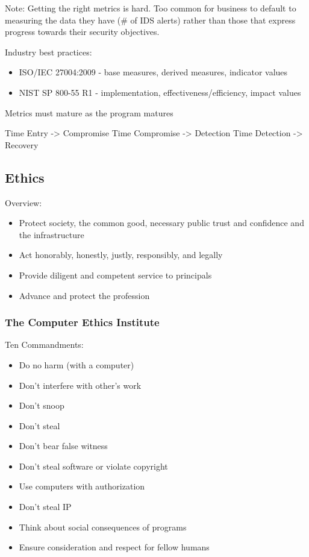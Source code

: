 \documentclass[11pt]{article}
\begin{document}
Note: Getting the right metrics is hard. Too common for business to default to measuring the data they have (\# of IDS alerts) rather than those that express progress towards their security objectives. 

Industry best practices:
\begin{itemize}
\item ISO/IEC 27004:2009 - base measures, derived measures, indicator values
\item NIST SP 800-55 R1 - implementation, effectiveness/efficiency, impact values
\end{itemize}

Metrics must mature as the program matures

Time Entry -> Compromise
Time Compromise -> Detection
Time Detection -> Recovery

\subsection{Ethics}
\label{sec:org9f8ccab}
Overview:
\begin{itemize}
\item Protect society, the common good, necessary public trust and confidence and the infrastructure
\item Act honorably, honestly, justly, responsibly, and legally
\item Provide diligent and competent service to principals
\item Advance and protect the profession
\end{itemize}

\subsubsection{The Computer Ethics Institute}
\label{sec:org6e24862}
Ten Commandments:
\begin{itemize}
\item Do no harm (with a computer)
\item Don't interfere with other's work
\item Don't snoop
\item Don't steal
\item Don't bear false witness
\item Don't steal software or violate copyright
\item Use computers with authorization
\item Don't steal IP
\item Think about social consequences of programs
\item Ensure consideration and respect for fellow humans
\end{itemize}
\end{document}
